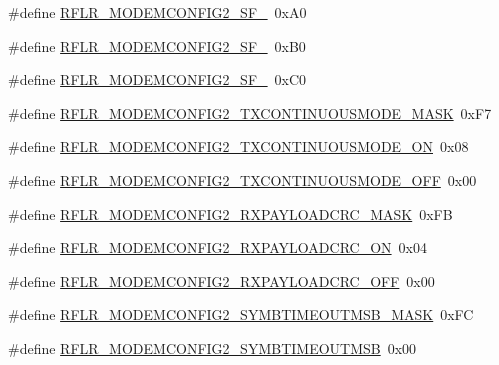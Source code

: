 \begin{DoxyCompactItemize}
\item 
\#define \mbox{\hyperlink{sx1276_regs-_lo_ra_8h_ad13461cea4b7c46dcb9043766b435ccf}{R\+F\+L\+R\+\_\+\+M\+O\+D\+E\+M\+C\+O\+N\+F\+I\+G2\+\_\+\+S\+F\+\_}}~0x\+A0
\item 
\#define \mbox{\hyperlink{sx1276_regs-_lo_ra_8h_a10a0b7d83cf516794592fe46263ebfb8}{R\+F\+L\+R\+\_\+\+M\+O\+D\+E\+M\+C\+O\+N\+F\+I\+G2\+\_\+\+S\+F\+\_}}~0x\+B0
\item 
\#define \mbox{\hyperlink{sx1276_regs-_lo_ra_8h_ab5d322da73b14a285604eb9d9cee496f}{R\+F\+L\+R\+\_\+\+M\+O\+D\+E\+M\+C\+O\+N\+F\+I\+G2\+\_\+\+S\+F\+\_}}~0x\+C0
\item 
\#define \mbox{\hyperlink{sx1276_regs-_lo_ra_8h_a56711c409baa81b02691cbdd892d99da}{R\+F\+L\+R\+\_\+\+M\+O\+D\+E\+M\+C\+O\+N\+F\+I\+G2\+\_\+\+T\+X\+C\+O\+N\+T\+I\+N\+U\+O\+U\+S\+M\+O\+D\+E\+\_\+\+M\+A\+SK}}~0x\+F7
\item 
\#define \mbox{\hyperlink{sx1276_regs-_lo_ra_8h_a8ff8561f45a2fd07a2c89fdf43d0142a}{R\+F\+L\+R\+\_\+\+M\+O\+D\+E\+M\+C\+O\+N\+F\+I\+G2\+\_\+\+T\+X\+C\+O\+N\+T\+I\+N\+U\+O\+U\+S\+M\+O\+D\+E\+\_\+\+ON}}~0x08
\item 
\#define \mbox{\hyperlink{sx1276_regs-_lo_ra_8h_a2044b58e88e240089fa471c3c7093982}{R\+F\+L\+R\+\_\+\+M\+O\+D\+E\+M\+C\+O\+N\+F\+I\+G2\+\_\+\+T\+X\+C\+O\+N\+T\+I\+N\+U\+O\+U\+S\+M\+O\+D\+E\+\_\+\+O\+FF}}~0x00
\item 
\#define \mbox{\hyperlink{sx1276_regs-_lo_ra_8h_a6a4d6c789643526dc38fda7cb00d2a46}{R\+F\+L\+R\+\_\+\+M\+O\+D\+E\+M\+C\+O\+N\+F\+I\+G2\+\_\+\+R\+X\+P\+A\+Y\+L\+O\+A\+D\+C\+R\+C\+\_\+\+M\+A\+SK}}~0x\+FB
\item 
\#define \mbox{\hyperlink{sx1276_regs-_lo_ra_8h_a29918f9915b10596c1a1403dc722c70f}{R\+F\+L\+R\+\_\+\+M\+O\+D\+E\+M\+C\+O\+N\+F\+I\+G2\+\_\+\+R\+X\+P\+A\+Y\+L\+O\+A\+D\+C\+R\+C\+\_\+\+ON}}~0x04
\item 
\#define \mbox{\hyperlink{sx1276_regs-_lo_ra_8h_a33586afd95b43ba36a0fa9fd199b0991}{R\+F\+L\+R\+\_\+\+M\+O\+D\+E\+M\+C\+O\+N\+F\+I\+G2\+\_\+\+R\+X\+P\+A\+Y\+L\+O\+A\+D\+C\+R\+C\+\_\+\+O\+FF}}~0x00
\item 
\#define \mbox{\hyperlink{sx1276_regs-_lo_ra_8h_a6a9255e1645c7a286b74c1a03980a7a1}{R\+F\+L\+R\+\_\+\+M\+O\+D\+E\+M\+C\+O\+N\+F\+I\+G2\+\_\+\+S\+Y\+M\+B\+T\+I\+M\+E\+O\+U\+T\+M\+S\+B\+\_\+\+M\+A\+SK}}~0x\+FC
\item 
\#define \mbox{\hyperlink{sx1276_regs-_lo_ra_8h_a2ac4fd798c0f4cca3b5b5f911da77941}{R\+F\+L\+R\+\_\+\+M\+O\+D\+E\+M\+C\+O\+N\+F\+I\+G2\+\_\+\+S\+Y\+M\+B\+T\+I\+M\+E\+O\+U\+T\+M\+SB}}~0x00

\end{DoxyCompactItemize}
